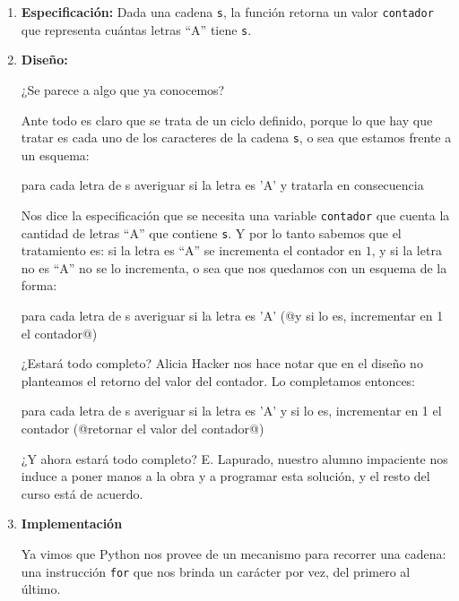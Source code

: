 \begin{enumerate}

\item {\bf Especificación: } Dada una cadena \lstinline!s!, la función
retorna un valor  \lstinline!contador! que representa cuántas letras ``A''
tiene \lstinline!s!.

\item {\bf Diseño: }

¿Se parece a algo que ya conocemos?

Ante todo es claro que se trata de un ciclo definido, porque lo que hay que
tratar es cada uno de los caracteres de la cadena \lstinline!s!, o sea que
estamos frente a un esquema:

\begin{codigo-nohl-sn}
para cada letra de s
    averiguar si la letra es 'A'
    y tratarla en consecuencia
\end{codigo-nohl-sn}

Nos dice la especificación que se necesita una variable
\lstinline!contador! que cuenta la cantidad de letras ``A'' que contiene
\lstinline!s!. Y por lo tanto sabemos que el tratamiento es: si la letra es
``A'' se incrementa el contador en $1$, y si la letra no es ``A'' no se lo
incrementa, o sea que nos quedamos con un esquema de la forma:

\begin{codigo-nohl-sn}
para cada letra de s
    averiguar si la letra es 'A'
    (@y si lo es, incrementar en 1 el contador@)
\end{codigo-nohl-sn}

¿Estará todo completo? Alicia Hacker nos hace notar que en el diseño no
planteamos el retorno del valor del contador. Lo completamos entonces:

\begin{codigo-nohl-sn}
para cada letra de s
    averiguar si la letra es 'A'
    y si lo es, incrementar en 1 el contador
(@retornar el valor del contador@)
\end{codigo-nohl-sn}

¿Y ahora estará todo completo? E. Lapurado, nuestro alumno impaciente nos
induce a poner manos a la obra y a programar esta solución, y el resto del
curso está de acuerdo.


\item {\bf Implementación}

Ya vimos que Python nos provee de un mecanismo para
recorrer una cadena: una instrucción \lstinline!for! que nos brinda un
carácter por vez, del primero al último.


\end{enumerate}
